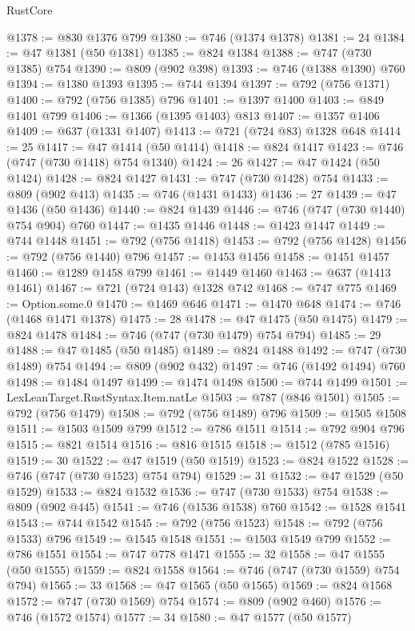 \begin{lexlean}{RustCore}
\begin{coremodule}
@1378 := @830 @1376 @799
@1380 := @746 (@1374 @1378)
@1381 := 24
@1384 := @47 @1381 (@50 @1381)
@1385 := @824 @1384
@1388 := @747 (@730 @1385) @754
@1390 := @809 (@902 @398)
@1393 := @746 (@1388 @1390) @760
@1394 := @1380 @1393
@1395 := @744 @1394
@1397 := @792 (@756 @1371)
@1400 := @792 (@756 @1385) @796
@1401 := @1397 @1400
@1403 := @849 @1401 @799
@1406 := @1366 (@1395 @1403) @813
@1407 := @1357 @1406
@1409 := @637 (@1331 @1407)
@1413 := @721 (@724 @83) @1328 @648
@1414 := 25
@1417 := @47 @1414 (@50 @1414)
@1418 := @824 @1417
@1423 := @746 (@747 (@730 @1418) @754 @1340)
@1424 := 26
@1427 := @47 @1424 (@50 @1424)
@1428 := @824 @1427
@1431 := @747 (@730 @1428) @754
@1433 := @809 (@902 @413)
@1435 := @746 (@1431 @1433)
@1436 := 27
@1439 := @47 @1436 (@50 @1436)
@1440 := @824 @1439
@1446 := @746 (@747 (@730 @1440) @754 @904) @760
@1447 := @1435 @1446
@1448 := @1423 @1447
@1449 := @744 @1448
@1451 := @792 (@756 @1418)
@1453 := @792 (@756 @1428)
@1456 := @792 (@756 @1440) @796
@1457 := @1453 @1456
@1458 := @1451 @1457
@1460 := @1289 @1458 @799
@1461 := @1449 @1460
@1463 := @637 (@1413 @1461)
@1467 := @721 (@724 @143) @1328 @742
@1468 := @747 @775
@1469 := Option.some.{0}
@1470 := @1469 @646
@1471 := @1470 @648
@1474 := @746 (@1468 @1471 @1378)
@1475 := 28
@1478 := @47 @1475 (@50 @1475)
@1479 := @824 @1478
@1484 := @746 (@747 (@730 @1479) @754 @794)
@1485 := 29
@1488 := @47 @1485 (@50 @1485)
@1489 := @824 @1488
@1492 := @747 (@730 @1489) @754
@1494 := @809 (@902 @432)
@1497 := @746 (@1492 @1494) @760
@1498 := @1484 @1497
@1499 := @1474 @1498
@1500 := @744 @1499
@1501 := LexLeanTarget.RustSyntax.Item.natLe
@1503 := @787 (@846 @1501)
@1505 := @792 (@756 @1479)
@1508 := @792 (@756 @1489) @796
@1509 := @1505 @1508
@1511 := @1503 @1509 @799
@1512 := @786 @1511
@1514 := @792 @904 @796
@1515 := @821 @1514
@1516 := @816 @1515
@1518 := @1512 (@785 @1516)
@1519 := 30
@1522 := @47 @1519 (@50 @1519)
@1523 := @824 @1522
@1528 := @746 (@747 (@730 @1523) @754 @794)
@1529 := 31
@1532 := @47 @1529 (@50 @1529)
@1533 := @824 @1532
@1536 := @747 (@730 @1533) @754
@1538 := @809 (@902 @445)
@1541 := @746 (@1536 @1538) @760
@1542 := @1528 @1541
@1543 := @744 @1542
@1545 := @792 (@756 @1523)
@1548 := @792 (@756 @1533) @796
@1549 := @1545 @1548
@1551 := @1503 @1549 @799
@1552 := @786 @1551
@1554 := @747 @778 @1471
@1555 := 32
@1558 := @47 @1555 (@50 @1555)
@1559 := @824 @1558
@1564 := @746 (@747 (@730 @1559) @754 @794)
@1565 := 33
@1568 := @47 @1565 (@50 @1565)
@1569 := @824 @1568
@1572 := @747 (@730 @1569) @754
@1574 := @809 (@902 @460)
@1576 := @746 (@1572 @1574)
@1577 := 34
@1580 := @47 @1577 (@50 @1577)

\end{coremodule}
\end{lexlean}
